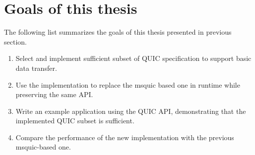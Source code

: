
\section{Goals of this thesis}

The following list summarizes the goals of this thesis presented in previous section.

\begin{enumerate}
  \item Select and implement sufficient subset of QUIC specification to support basic data transfer.

  \item Use the implementation to replace the msquic based one in \dotnet{} runtime while preserving
    the same API\@. 

  \item Write an example application using the QUIC API, demonstrating that the implemented QUIC
    subset is sufficient. 

  \item Compare the performance of the new implementation with the previous msquic-based one.

\end{enumerate}
